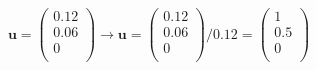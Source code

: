 \documentclass[prb]{revtex4}%
\begin{document}
\begin{equation}
    \textbf{u} = \left(
                     \begin{array}{c}
                       0.12 \\
                       0.06 \\
                       0 \\
                     \end{array}
                   \right)
\rightarrow     \textbf{u} = \left(
                     \begin{array}{c}
                       0.12 \\
                       0.06 \\
                       0 \\
                     \end{array}
                   \right) / 0.12 = \left(
                     \begin{array}{c}
                       1 \\
                       0.5 \\
                       0 \\
                     \end{array}
                   \right)
\end{equation}
\end{document}
